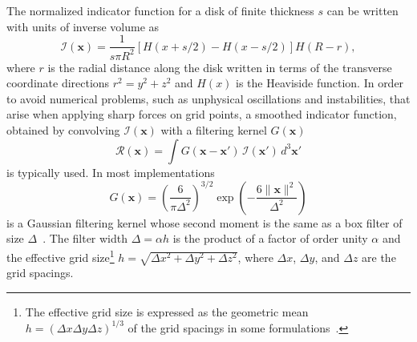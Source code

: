 \documentclass{article}
\begin{document}
The normalized indicator function for a disk of finite thickness $s$ can be written with units of inverse volume as
\begin{equation}
\label{eq:sharp-indicator}
\mathcal{I}(\mathbf{x}) = \frac{1}{s \pi R^2}\left[ H(x+s/2) - H(x - s/2) \right] H(R - r),
\end{equation}
where  $r$ is the radial distance along the disk written in terms of the transverse coordinate directions $r^2 = y^2 + z^2$ and $H(x)$ is the Heaviside function. In order to avoid numerical problems, such as unphysical oscillations and instabilities, that arise when applying sharp forces on grid points, a smoothed indicator function, obtained by convolving $\mathcal{I}(\mathbf{x})$ with a filtering kernel $G(\mathbf{x})$
%
\begin{equation}
\label{eq:smooth-indicator}
\mathcal{R}(\mathbf{x}) = \int G(\mathbf{x}-\mathbf{x'}) \, \mathcal{I}(\mathbf{x'}) \, d^3\mathbf{x'}
\end{equation}
is typically used. In most implementations~\cite{Calaf2010a, Meyers2010a}
\begin{equation}
G(\mathbf{x}) = \left(\frac{6}{\pi \Delta^2}\right)^{3/2} \exp \left( -\frac{6\lVert\mathbf{x}\rVert^2}{\Delta^2} \right)
\end{equation}
%
is a Gaussian filtering kernel whose second moment is the same as a box filter of size $\Delta$~\cite{Pope2000a}. The filter width $\Delta= \alpha h $ is the product of a factor of order unity $\alpha$ and the effective grid size\footnote{The effective grid size is expressed as the geometric mean $h = (\Delta x \Delta y \Delta z)^{1/3}$ of the grid spacings in some formulations~\cite{Lignarolo2016a}.} $h = \sqrt{\Delta x^2 + \Delta y^2 + \Delta z^2}$, where $\Delta x$, $\Delta y$, and $\Delta z$ are the grid spacings.
\end{document}
